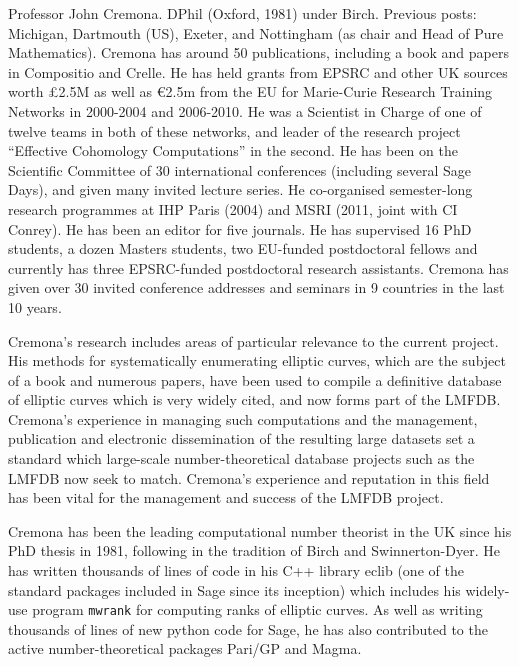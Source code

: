 Professor John Cremona.  DPhil (Oxford, 1981) under Birch.  Previous
posts: Michigan, Dartmouth (US), Exeter, and Nottingham (as chair and
Head of Pure Mathematics). Cremona has around 50 publications,
including a book and papers in Compositio and Crelle.  He has held
grants from EPSRC and other UK sources worth \pounds2.5M as well as
\euro2.5m from the EU for Marie-Curie Research Training Networks in
2000-2004 and 2006-2010.  He was a Scientist in Charge of one of
twelve teams in both of these networks, and leader of the research
project ``Effective Cohomology Computations'' in the second.  He has
been on the Scientific Committee of 30 international conferences
(including several Sage Days), and given many invited lecture series.
He co-organised semester-long research programmes at IHP Paris (2004)
and MSRI (2011, joint with CI Conrey).  He has been an editor for five
journals.  He has supervised 16 PhD students, a dozen Masters
students, two EU-funded postdoctoral fellows and currently has three
EPSRC-funded postdoctoral research assistants.  Cremona has given over
30 invited conference addresses and seminars in 9 countries in the
last 10 years.

Cremona's research includes areas of particular relevance to the
current project.  His methods for systematically enumerating elliptic
curves, which are the subject of a book and numerous papers, have been
used to compile a definitive database of elliptic curves which is very
widely cited, and now forms part of the LMFDB.  Cremona's experience
in managing such computations and the management, publication and
electronic dissemination of the resulting large datasets set a
standard which large-scale number-theoretical database projects such
as the LMFDB now seek to match.  Cremona's experience and reputation
in this field has been vital for the management and success of the
LMFDB project.

Cremona has been the leading computational number theorist in the UK
since his PhD thesis in 1981, following in the tradition of Birch and
Swinnerton-Dyer.  He has written thousands of lines of code in his C++
library eclib (one of the standard packages included in Sage since its
inception) which includes his widely-use program {\tt mwrank} for
computing ranks of elliptic curves.  As well as writing thousands of
lines of new python code for Sage, he has also contributed to the
active number-theoretical packages Pari/GP and Magma.
